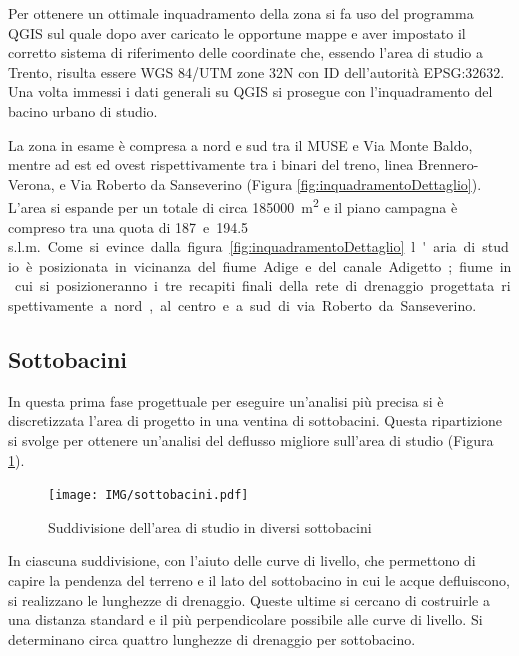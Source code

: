 Per ottenere un ottimale inquadramento della zona si fa uso del programma QGIS sul quale dopo aver caricato le opportune mappe e aver impostato il corretto sistema di riferimento delle coordinate che, essendo l'area di studio a Trento, risulta essere WGS 84/UTM zone 32N con ID dell'autorità EPSG:32632.
Una volta immessi i dati generali su QGIS si prosegue con l'inquadramento del bacino urbano di studio.

La zona in esame è compresa a nord e sud tra il MUSE e Via Monte Baldo, mentre ad est ed ovest rispettivamente tra i binari del treno, linea Brennero-Verona, e Via Roberto da Sanseverino (Figura \ref{fig:inquadramentoDettaglio}).
L'area si espande per un totale di circa \SI{185000}{\square\metre} e il piano campagna è compreso tra una quota di \SI{187} e \SI{194.5}{\metre\,s.l.m.}. 

Come si evince dalla figura \ref{fig:inquadramentoDettaglio} l'aria di studio è posizionata in vicinanza del fiume Adige e del canale Adigetto; fiume in cui si posizioneranno i tre recapiti finali della rete di drenaggio progettata rispettivamente a nord, al centro e a sud di via Roberto da Sanseverino.

\subsection{Sottobacini}

In questa prima fase progettuale per eseguire un'analisi più precisa si è discretizzata l'area di progetto in una ventina di sottobacini. 
Questa ripartizione si svolge per ottenere un'analisi del deflusso migliore sull'area di studio (Figura \ref{fig:sottobacini}).

\begin{figure}[p]
    \centering
    \texttt{[image: IMG/sottobacini.pdf]} 
    \caption{Suddivisione dell'area di studio in diversi sottobacini}
    \label{fig:sottobacini}
\end{figure}

In ciascuna suddivisione, con l'aiuto delle curve di livello, che permettono di capire la pendenza del terreno e il lato del sottobacino in cui le acque defluiscono, si realizzano le lunghezze di drenaggio. 
Queste ultime si cercano di costruirle a una distanza standard e il più perpendicolare possibile alle curve di livello.
Si determinano circa quattro lunghezze di drenaggio per sottobacino.

